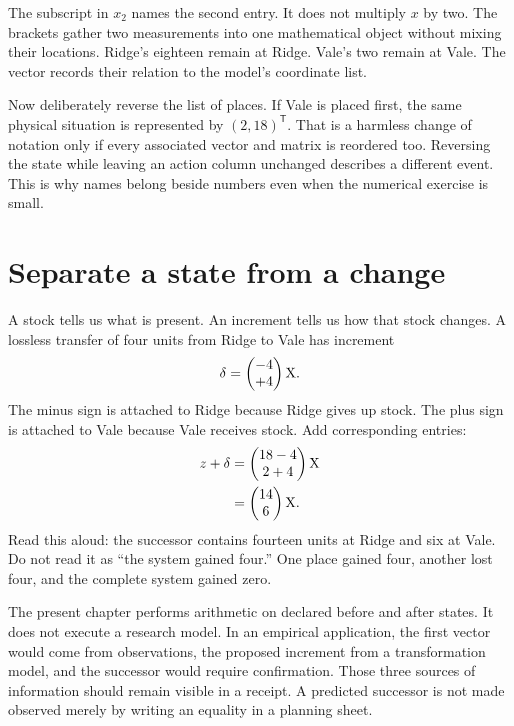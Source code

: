 The subscript in \(x_2\) names the second entry. It does not multiply \(x\) by two. The brackets gather two measurements into one mathematical object without mixing their locations. Ridge's eighteen remain at Ridge. Vale's two remain at Vale. The vector records their relation to the model's coordinate list.

Now deliberately reverse the list of places. If Vale is placed first, the same physical situation is represented by \((2,18)^{\mathsf T}\). That is a harmless change of notation only if every associated vector and matrix is reordered too. Reversing the state while leaving an action column unchanged describes a different event. This is why names belong beside numbers even when the numerical exercise is small.

\section{Separate a state from a change}

A stock tells us what is present. An increment tells us how that stock changes. A lossless transfer of four units from Ridge to Vale has increment
\begin{equation}
\delta=\begin{pmatrix}-4\\+4\end{pmatrix}\mathrm{X}.
\end{equation}
The minus sign is attached to Ridge because Ridge gives up stock. The plus sign is attached to Vale because Vale receives stock. Add corresponding entries:
\begin{align}
z+\delta
&=\begin{pmatrix}18-4\\2+4\end{pmatrix}\mathrm{X}\\
&=\begin{pmatrix}14\\6\end{pmatrix}\mathrm{X}.
\end{align}
Read this aloud: the successor contains fourteen units at Ridge and six at Vale. Do not read it as ``the system gained four.'' One place gained four, another lost four, and the complete system gained zero.

The present chapter performs arithmetic on declared before and after states. It does not execute a research model. In an empirical application, the first vector would come from observations, the proposed increment from a transformation model, and the successor would require confirmation. Those three sources of information should remain visible in a receipt. A predicted successor is not made observed merely by writing an equality in a planning sheet.

